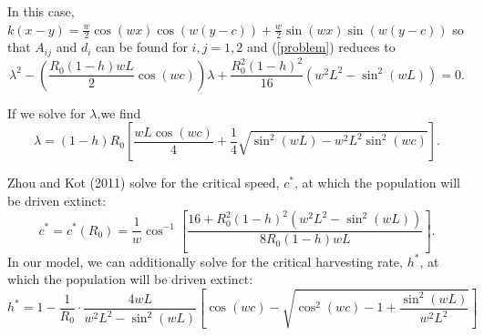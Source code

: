 \documentclass[12pt,english]{article}
\begin{document}
In this case, $k(x-y)=\frac{w}{2}\cos(wx)\cos(w(y-c))+\frac{w}{2}\sin(wx)\sin(w(y-c))$ so that $A_{ij}$ and $d_i$ can be found for $i,j=1,2$ and (\ref{problem}) reduces to 
$$\lambda^2-\left(\frac{R_0(1-h)wL}{2}\cos(wc)\right)\lambda+\frac{R_0^2(1-h)^2}{16}\left(w^2L^2-\sin^2(wL)\right)=0.$$

If we solve for $\lambda$,we find
\begin{equation*} \lambda=(1-h)R_0\left[\frac{wL\cos(wc)}{4}+\frac{1}{4}\sqrt{\sin^2(wL)-w^2L^2\sin^2(wc)}\right]. \label{cosine} \end{equation*}


Zhou and Kot (2011) solve for the critical speed, $c^*$, at which the population will be driven extinct:
$$c^*=c^*(R_0)=\frac{1}{w}\cos^{-1}\left[\frac{16+R_0^2(1-h)^2(w^2L^2-\sin^2(wL))}{8R_0(1-h)wL}\right].$$
In our model, we can additionally solve for the critical harvesting rate, $h^*$, at which the population will be driven extinct:
$$
h^*=1-\frac{1}{R_0}\cdot\frac{4wL}{w^2L^2-\sin^2(wL)}\left[\cos(wc)-\sqrt{\cos^2(wc)-1+\frac{\sin^2(wL)}{w^2L^2}}\right] 
$$
\end{document}

